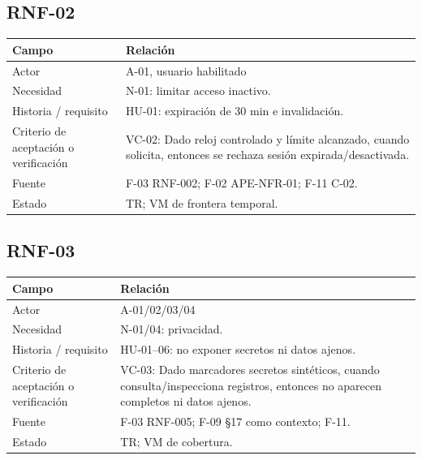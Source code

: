 \documentclass[12pt,a4paper]{report}
\begin{document}
\subsection{RNF-02}\label{matriz-RNF-02}

{\def\LTcaptype{none} %
\begin{longtable}[]{@{}
  >{\raggedright\arraybackslash}p{}
  >{\raggedright\arraybackslash}p{}@{}}
\toprule\noalign{}
\begin{minipage}[b]{\linewidth}\raggedright
Campo
\end{minipage} & \begin{minipage}[b]{\linewidth}\raggedright
Relación
\end{minipage} \\
\midrule\noalign{}
\endhead
\bottomrule\noalign{}
\endlastfoot
Actor & A-01, usuario habilitado \\
Necesidad & N-01: limitar acceso inactivo. \\
Historia / requisito & HU-01: expiración de 30 min e invalidación. \\
Criterio de aceptación o verificación & VC-02: Dado reloj controlado
y límite alcanzado, cuando solicita, entonces se rechaza sesión
expirada/desactivada. \\
Fuente & F-03 RNF-002; F-02 APE-NFR-01; F-11 C-02. \\
Estado & TR; VM de frontera temporal. \\
\end{longtable}
}

\subsection{RNF-03}\label{matriz-RNF-03}

{\def\LTcaptype{none} %
\begin{longtable}[]{@{}
  >{\raggedright\arraybackslash}p{}
  >{\raggedright\arraybackslash}p{}@{}}
\toprule\noalign{}
\begin{minipage}[b]{\linewidth}\raggedright
Campo
\end{minipage} & \begin{minipage}[b]{\linewidth}\raggedright
Relación
\end{minipage} \\
\midrule\noalign{}
\endhead
\bottomrule\noalign{}
\endlastfoot
Actor & A-01/02/03/04 \\
Necesidad & N-01/04: privacidad. \\
Historia / requisito & HU-01--06: no exponer secretos ni datos
ajenos. \\
Criterio de aceptación o verificación & VC-03: Dado marcadores
secretos sintéticos, cuando consulta/inspecciona registros, entonces no
aparecen completos ni datos ajenos. \\
Fuente & F-03 RNF-005; F-09 §17 como contexto; F-11. \\
Estado & TR; VM de cobertura. \\
\end{longtable}
}
\end{document}
